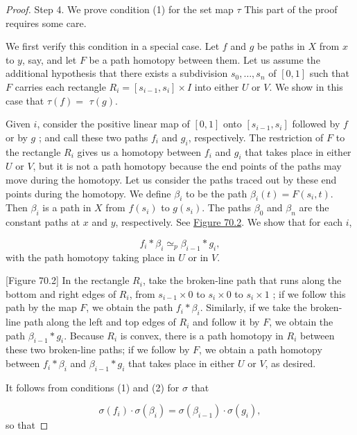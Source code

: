 \begin{proof}
Step 4. We prove condition (1) for the set map \(\tau\) This part of the proof requires some care.

We first verify this condition in a special case. Let \(f\) and \(g\) be paths in \(X\) from \(x\) to \(y\), say, and let \(F\) be a path homotopy between them. Let us assume the additional hypothesis that there exists a subdivision \(s_{0},\ldots ,s_{n}\) of \([ {0,1}]\) such that \(F\) carries each rectangle \(R_{i} = [ {s_{i - 1},s_{i}}] \times I\) into either \(U\) or \(V\). We show in this case that \(\tau ( f) =\) \(\tau ( g)\).

Given \(i\), consider the positive linear map of \([ {0,1}]\) onto \([ {s_{i - 1},s_{i}}]\) followed by \(f\) or by \(g\) ; and call these two paths \(f_{i}\) and \(g_{i}\), respectively. The restriction of \(F\) to the rectangle \(R_{i}\) gives us a homotopy between \(f_{i}\) and \(g_{i}\) that takes place in either \(U\) or \(V\), but it is not a path homotopy because the end points of the paths may move during the homotopy. Let us consider the paths traced out by these end points during the homotopy. We define \({\beta }_{i}\) to be the path \({\beta }_{i}( t) = F( {s_{i},t})\). Then \({\beta }_{i}\) is a path in \(X\) from \(f( s_{i})\) to \(g( s_{i})\). The paths \({\beta }_{0}\) and \({\beta }_{n}\) are the constant paths at \(x\) and \(y\), respectively. See \hyperref[fig:70.2]{Figure 70.2}. We show that for each \(i\),

\[
f_{i} * {\beta }_{i}{ \simeq }_{p}{\beta }_{i - 1} * g_{i},
\]
with the path homotopy taking place in \(U\) or in \(V\).

[Figure 70.2]
In the rectangle \(R_{i}\), take the broken-line path that runs along the bottom and right edges of \(R_{i}\), from \(s_{i - 1} \times 0\) to \(s_{i} \times 0\) to \(s_{i} \times 1\) ; if we follow this path by the map \(F\), we obtain the path \(f_{i} * {\beta }_{i}\). Similarly, if we take the broken-line path along the left and top edges of \(R_{i}\) and follow it by \(F\), we obtain the path \({\beta }_{i - 1} * g_{i}\). Because \(R_{i}\) is convex, there is a path homotopy in \(R_{i}\) between these two broken-line paths; if we follow by \(F\), we obtain a path homotopy between \(f_{i} * {\beta }_{i}\) and \({\beta }_{i - 1} * g_{i}\) that takes place in either \(U\) or \(V\), as desired.

It follows from conditions (1) and (2) for \(\sigma\) that

\[
\sigma ( f_{i}) \cdot \sigma ( {\beta }_{i}) = \sigma ( {\beta }_{i - 1}) \cdot \sigma ( g_{i}),
\]
so that


\end{proof}
